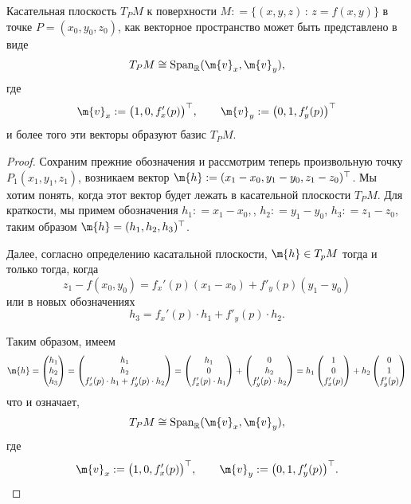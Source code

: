 \begin{theorem}
 Касательная плоскость $T_PM$ к поверхности $M: = \{(x,y,z)\, : \, z  = f(x,y) \}$ в точке $P= (x_0,y_0,z_0)$, как векторное пространство может быть представлено в виде
 \[
 T_PM \cong \mathrm{Span}_\mathbb{R}(\m{v}_x, \m{v}_y),
 \]
 где
 \[
  \m{v}_x : = \bigl( 1,0, f'_x(p) \bigr)^\top, \qquad  \m{v}_y : = \bigl( 0,1, f'_y(p) \bigr)^\top
\]
и более того эти векторы образуют базис $T_PM.$
\end{theorem}
\begin{proof}
 
Сохраним прежние обозначения и рассмотрим теперь произвольную точку $P_1(x_1,y_1,z_1)$, возникаем вектор $\m{h}: = (x_1 - x_0, y_1-y_0, z_1-z_0)^\top$. Мы хотим понять, когда этот вектор будет лежать в касательной плоскости $T_PM.$ Для краткости, мы примем обозначения $h_1: = x_1 - x_0,$, $h_2: = y_1- y_0$, $h_3: = z_1 - z_0$, таким образом $\m{h} = (h_1,h_2,h_3)^\top$.

Далее, согласно определению касатальной плоскости, $\m{h} \in T_pM$ тогда и только тогда, когда 
 \[
z_1 - f(x_0,y_0) = f_x'(p) (x_1-x_0) + f'_y(p) (y_1-y_0)
\]
или в новых обозначениях
\[
 h_3 = f_x'(p) \cdot h_1 + f'_y(p) \cdot h_2.
\]

Таким образом, имеем
\[
 \m{h} = \begin{pmatrix}
     h_1 \\ h_2 \\h_3
 \end{pmatrix} = \begin{pmatrix}
     h_1 \\ h_2 \\ f_x'(p) \cdot h_1 + f'_y(p) \cdot h_2
 \end{pmatrix} = \begin{pmatrix}
     h_1 \\ 0 \\ f_x'(p) \cdot h_1
 \end{pmatrix} + \begin{pmatrix}
     0 \\ h_2 \\ f'_y(p) \cdot h_2
 \end{pmatrix} = h_1 \begin{pmatrix}
     1 \\ 0 \\ f'_x(p)
 \end{pmatrix} + h_2 \begin{pmatrix}
     0 \\ 1 \\ f'_y(p)
 \end{pmatrix}
\]
что и означает,
 \[
 T_PM \cong \mathrm{Span}_\mathbb{R}(\m{v}_x, \m{v}_y),
 \]
 где
 \[
  \m{v}_x : = \bigl( 1,0, f'_x(p) \bigr)^\top, \qquad  \m{v}_y : = \bigl( 0,1, f'_y(p) \bigr)^\top.
\]


\end{proof}
